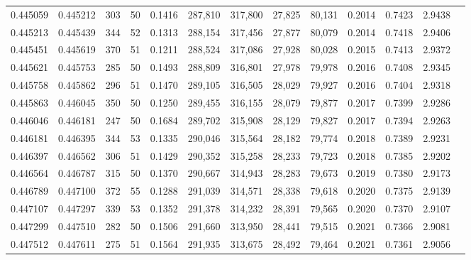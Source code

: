 \begin{tabular}{rrrrrrrrrrrrr}
0.445059 & 0.445212 &   303 &  50 &                                     0.1416 & 287,810 & 317,800 &  27,825 &  80,131 & 0.2014 & 0.7423 & 2.9438 \\
0.445213 & 0.445439 &   344 &  52 &                                     0.1313 & 288,154 & 317,456 &  27,877 &  80,079 & 0.2014 & 0.7418 & 2.9406 \\
0.445451 & 0.445619 &   370 &  51 &                                     0.1211 & 288,524 & 317,086 &  27,928 &  80,028 & 0.2015 & 0.7413 & 2.9372 \\
0.445621 & 0.445753 &   285 &  50 &                                     0.1493 & 288,809 & 316,801 &  27,978 &  79,978 & 0.2016 & 0.7408 & 2.9345 \\
0.445758 & 0.445862 &   296 &  51 &                                     0.1470 & 289,105 & 316,505 &  28,029 &  79,927 & 0.2016 & 0.7404 & 2.9318 \\
0.445863 & 0.446045 &   350 &  50 &                                     0.1250 & 289,455 & 316,155 &  28,079 &  79,877 & 0.2017 & 0.7399 & 2.9286 \\
0.446046 & 0.446181 &   247 &  50 &                                     0.1684 & 289,702 & 315,908 &  28,129 &  79,827 & 0.2017 & 0.7394 & 2.9263 \\
0.446181 & 0.446395 &   344 &  53 &                                     0.1335 & 290,046 & 315,564 &  28,182 &  79,774 & 0.2018 & 0.7389 & 2.9231 \\
0.446397 & 0.446562 &   306 &  51 &                                     0.1429 & 290,352 & 315,258 &  28,233 &  79,723 & 0.2018 & 0.7385 & 2.9202 \\
0.446564 & 0.446787 &   315 &  50 &                                     0.1370 & 290,667 & 314,943 &  28,283 &  79,673 & 0.2019 & 0.7380 & 2.9173 \\
0.446789 & 0.447100 &   372 &  55 &                                     0.1288 & 291,039 & 314,571 &  28,338 &  79,618 & 0.2020 & 0.7375 & 2.9139 \\
0.447107 & 0.447297 &   339 &  53 &                                     0.1352 & 291,378 & 314,232 &  28,391 &  79,565 & 0.2020 & 0.7370 & 2.9107 \\
0.447299 & 0.447510 &   282 &  50 &                                     0.1506 & 291,660 & 313,950 &  28,441 &  79,515 & 0.2021 & 0.7366 & 2.9081 \\
0.447512 & 0.447611 &   275 &  51 &                                     0.1564 & 291,935 & 313,675 &  28,492 &  79,464 & 0.2021 & 0.7361 & 2.9056 \\

\end{tabular}
